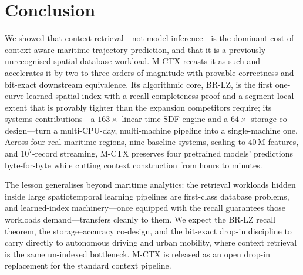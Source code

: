 \section{Conclusion}\label{sec:conclusion}

We showed that context retrieval---not model inference---is the dominant
cost of context-aware maritime trajectory prediction, and that it is a
previously unrecognised spatial database workload. M-CTX recasts it as
such and accelerates it by two to three orders of magnitude with provable
correctness and bit-exact downstream equivalence. Its algorithmic core,
BR-LZ, is the first one-curve learned spatial index with a recall-completeness
proof and a segment-local extent that is provably tighter than the
expansion competitors require; its systems contributions---a $163\times$
linear-time SDF engine and a $64\times$ storage co-design---turn a
multi-CPU-day, multi-machine pipeline into a single-machine one. Across
four real maritime regions, nine baseline systems, scaling to $40$\,M
features, and $10^{7}$-record streaming, M-CTX preserves four pretrained
models' predictions byte-for-byte while cutting context construction from
hours to minutes.

The lesson generalises beyond maritime analytics: the retrieval workloads
hidden inside large spatiotemporal learning pipelines are first-class
database problems, and learned-index machinery---once equipped with the
recall guarantees those workloads demand---transfers cleanly to them. We
expect the BR-LZ recall theorem, the storage--accuracy co-design, and the
bit-exact drop-in discipline to carry directly to autonomous driving and
urban mobility, where context retrieval is the same un-indexed
bottleneck. M-CTX is released as an open drop-in replacement for the
standard context pipeline.
